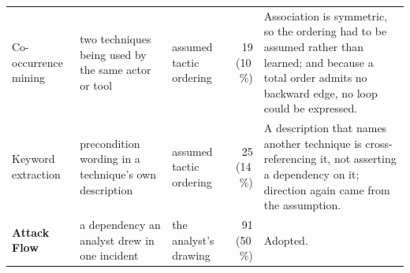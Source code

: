 \begin{table}[htbp]
\begin{tabular}{@{}l >{\raggedright\arraybackslash}p{} >{\raggedright\arraybackslash}p{} r >{\raggedright\arraybackslash}p{}@{}}
\midrule
Co-occurrence mining & two techniques being used by the same actor or tool & assumed tactic ordering & 19 (10\,\%) & Association is symmetric, so the ordering had to be assumed rather than learned; and because a total order admits no backward edge, no loop could be expressed. \\
Keyword extraction & precondition wording in a technique's own description & assumed tactic ordering & 25 (14\,\%) & A description that names another technique is cross-referencing it, not asserting a dependency on it; direction again came from the assumption. \\
\textbf{Attack Flow} & a dependency an analyst drew in one incident & the analyst's drawing & 91 (50\,\%) & Adopted. \\
\bottomrule
\end{tabular}
\end{table}
